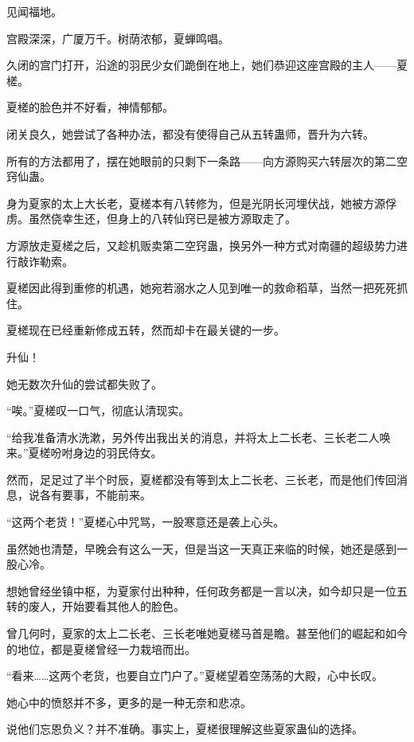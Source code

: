 
\begin{this_body}

见闻福地。

宫殿深深，广厦万千。树荫浓郁，夏蝉鸣唱。

久闭的宫门打开，沿途的羽民少女们跪倒在地上，她们恭迎这座宫殿的主人——夏槎。

夏槎的脸色并不好看，神情郁郁。

闭关良久，她尝试了各种办法，都没有使得自己从五转蛊师，晋升为六转。

所有的方法都用了，摆在她眼前的只剩下一条路——向方源购买六转层次的第二空窍仙蛊。

身为夏家的太上大长老，夏槎本有八转修为，但是光阴长河埋伏战，她被方源俘虏。虽然侥幸生还，但身上的八转仙窍已是被方源取走了。

方源放走夏槎之后，又趁机贩卖第二空窍蛊，换另外一种方式对南疆的超级势力进行敲诈勒索。

夏槎因此得到重修的机遇，她宛若溺水之人见到唯一的救命稻草，当然一把死死抓住。

夏槎现在已经重新修成五转，然而却卡在最关键的一步。

升仙！

她无数次升仙的尝试都失败了。

“唉。”夏槎叹一口气，彻底认清现实。

“给我准备清水洗漱，另外传出我出关的消息，并将太上二长老、三长老二人唤来。”夏槎吩咐身边的羽民侍女。

然而，足足过了半个时辰，夏槎都没有等到太上二长老、三长老，而是他们传回消息，说各有要事，不能前来。

“这两个老货！”夏槎心中咒骂，一股寒意还是袭上心头。

虽然她也清楚，早晚会有这么一天，但是当这一天真正来临的时候，她还是感到一股心冷。

想她曾经坐镇中枢，为夏家付出种种，任何政务都是一言以决，如今却只是一位五转的废人，开始要看其他人的脸色。

曾几何时，夏家的太上二长老、三长老唯她夏槎马首是瞻。甚至他们的崛起和如今的地位，都是夏槎曾经一力栽培而出。

“看来……这两个老货，也要自立门户了。”夏槎望着空荡荡的大殿，心中长叹。

她心中的愤怒并不多，更多的是一种无奈和悲凉。

说他们忘恩负义？并不准确。事实上，夏槎很理解这些夏家蛊仙的选择。


\end{this_body}
